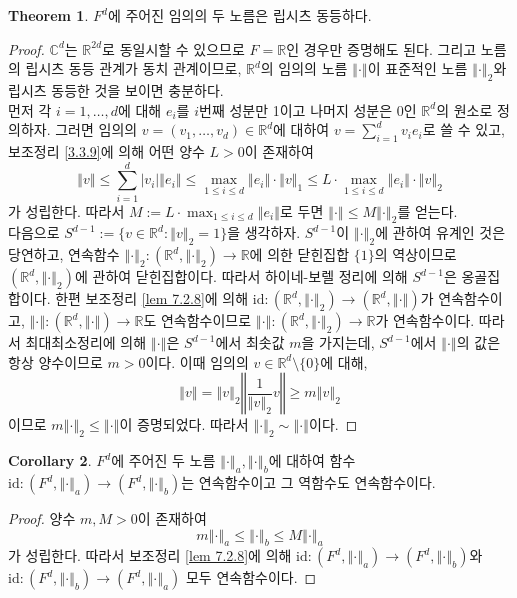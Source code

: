\documentclass[11pt]{book}
\numberwithin{equation}{chapter}
\def\RR{\mathbb{R}}
\def\CC{\mathbb{C}}
\def\id{\text{id}}
\newcommand{\abs}[1]{\left\vert#1\right\vert}
\newcommand{\norm}[1]{\left\Vert#1\right\Vert}
\theoremstyle{definition}
\newtheorem{thm}{Theorem}[section]
\newtheorem{cor}[thm]{Corollary}
\begin{document}
\begin{thm}
    \(F^d\)에 주어진 임의의 두 노름은 립시츠 동등하다.
\end{thm}
\begin{proof}
    \(\CC^d\)는 \(\RR^{2d}\)로 동일시할 수 있으므로 \(F = \RR\)인 경우만 증명해도 된다. 그리고 노름의 립시츠 동등 관계가 동치 관계이므로, \(\RR^d\)의 임의의 노름 \(\norm{\cdot}\)이 표준적인 노름 \(\norm{\cdot}_2\)와 립시츠 동등한 것을 보이면 충분하다.\\
    먼저 각 \(i = 1, \ldots, d\)에 대해 \(e_i\)를 \(i\)번째 성분만 1이고 나머지 성분은 0인 \(\RR^d\)의 원소로 정의하자. 그러면 임의의 \(v = (v_1, \ldots, v_d) \in \RR^d\)에 대하여 \(v = \sum_{i=1}^d v_i e_i\)로 쓸 수 있고, 보조정리 \ref{3.3.9}에 의해 어떤 양수 \(L > 0\)이 존재하여
    \[
        \norm{v} \le \sum_{i=1}^d \abs{v_i} \norm{e_i} \le \max_{1 \le i \le d} \norm{e_i} \cdot \norm{v}_1 \le L \cdot \max_{1 \le i \le d} \norm{e_i} \cdot \norm{v}_2
    \]
    가 성립한다. 따라서 \(M := L \cdot \max_{1 \le i \le d} \norm{e_i}\)로 두면 \(\norm{\cdot} \le M \norm{\cdot}_2\)를 얻는다.\\
    다음으로 \(S^{d-1} := \{v \in \RR^d : \norm{v}_2 = 1\}\)을 생각하자. \(S^{d-1}\)이 \(\norm{\cdot}_2\)에 관하여 유계인 것은 당연하고, 연속함수 \(\norm{\cdot}_2 : (\RR^d, \norm{\cdot}_2) \to \RR\)에 의한 닫힌집합 \(\{1\}\)의 역상이므로 \((\RR^d, \norm{\cdot}_2)\)에 관하여 닫힌집합이다. 따라서 하이네-보렐 정리에 의해 \(S^{d-1}\)은 옹골집합이다. 한편 보조정리 \ref{lem 7.2.8}에 의해 \(\id : (\RR^d, \norm{\cdot}_2) \to (\RR^d, \norm{\cdot})\)가 연속함수이고, \(\norm{\cdot} : (\RR^d, \norm{\cdot}) \to \RR\)도 연속함수이므로 \(\norm{\cdot} : (\RR^d, \norm{\cdot}_2) \to \RR\)가 연속함수이다. 따라서 최대최소정리에 의해 \(\norm{\cdot}\)은 \(S^{d-1}\)에서 최솟값 \(m\)을 가지는데, \(S^{d-1}\)에서 \(\norm{\cdot}\)의 값은 항상 양수이므로 \(m >  0\)이다. 이때 임의의 \(v \in \RR^d \setminus \{0\}\)에 대해,
    \[
        \norm{v} = \norm{v}_2 \norm{\frac{1}{\norm{v}_2}v} \ge m\norm{v}_2
    \]
    이므로 \(m\norm{\cdot}_2 \le \norm{\cdot}\)이 증명되었다. 따라서 \(\norm{\cdot}_2 \sim \norm{\cdot}\)이다.
\end{proof}

\begin{cor}
    \(F^d\)에 주어진 두 노름 \(\norm{\cdot}_a, \norm{\cdot}_b\)에 대하여 함수 \(\id : (F^d, \norm{\cdot}_a) \to (F^d, \norm{\cdot}_b)\)는 연속함수이고 그 역함수도 연속함수이다.
\end{cor}
\begin{proof}
    양수 \(m, M > 0\)이 존재하여
    \[
        m \norm{\cdot}_a \le \norm{\cdot}_b \le M \norm{\cdot}_a    
    \]
    가 성립한다. 따라서 보조정리 \ref{lem 7.2.8}에 의해 \(\id : (F^d, \norm{\cdot}_a) \to (F^d, \norm{\cdot}_b)\)와 \(\id : (F^d, \norm{\cdot}_b) \to (F^d, \norm{\cdot}_a)\) 모두 연속함수이다.
\end{proof}
\end{document}
